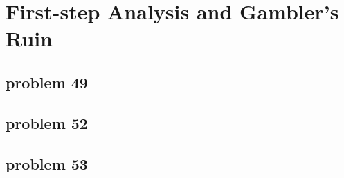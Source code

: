 \section{First-step Analysis and Gambler's Ruin}

\subsection{problem 49}


\subsection{problem 52}


\subsection{problem 53}
